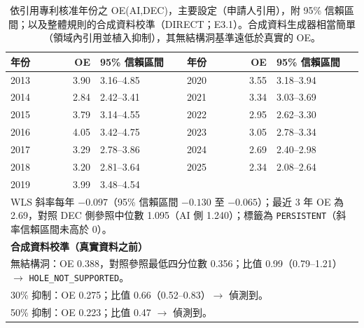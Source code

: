 \begin{table}[tbp]
\centering
\caption{依引用專利核准年份之 OE(AI,DEC)，主要設定（申請人引用），附 95\% 信賴區間；以及整體規則的合成資料校準（DIRECT；E3.1）。合成資料生成器相當簡單（領域內引用並植入抑制），其無結構洞基準遠低於真實的 OE。}
\label{zh:tab:app_oeyear}
\footnotesize
\begin{tabular}{lrl@{\hspace{1.2cm}}lrl}
\toprule
年份 & OE & 95\% 信賴區間 & 年份 & OE & 95\% 信賴區間 \\
\midrule
2013 & 3.90 & 3.16--4.85 & 2020 & 3.55 & 3.18--3.94 \\
2014 & 2.84 & 2.42--3.41 & 2021 & 3.34 & 3.03--3.69 \\
2015 & 3.79 & 3.14--4.55 & 2022 & 2.95 & 2.62--3.30 \\
2016 & 4.05 & 3.42--4.75 & 2023 & 3.05 & 2.78--3.34 \\
2017 & 3.29 & 2.78--3.86 & 2024 & 2.69 & 2.40--2.98 \\
2018 & 3.20 & 2.81--3.64 & 2025 & 2.34 & 2.08--2.64 \\
2019 & 3.99 & 3.48--4.54 & & & \\
\midrule
\multicolumn{6}{p{8.4cm}}{WLS 斜率每年 $-0.097$（95\% 信賴區間 $-0.130$ 至 $-0.065$）；最近 3 年 OE 為 2.69，對照 DEC 側參照中位數 1.095（AI 側 1.240）；標籤為 \texttt{PERSISTENT}（斜率信賴區間未高於 0）。} \\
\midrule
\multicolumn{6}{l}{\textbf{合成資料校準（真實資料之前）}} \\
\multicolumn{6}{p{8.4cm}}{無結構洞：OE 0.388，對照參照最低四分位數 0.356；比值 0.99（0.79--1.21）$\rightarrow$ \texttt{HOLE\_\allowbreak NOT\_\allowbreak SUPPORTED}。} \\
\multicolumn{6}{p{8.4cm}}{30\% 抑制：OE 0.275；比值 0.66（0.52--0.83）$\rightarrow$ 偵測到。} \\
\multicolumn{6}{p{8.4cm}}{50\% 抑制：OE 0.223；比值 0.47 $\rightarrow$ 偵測到。} \\
\bottomrule
\end{tabular}
\end{table}

